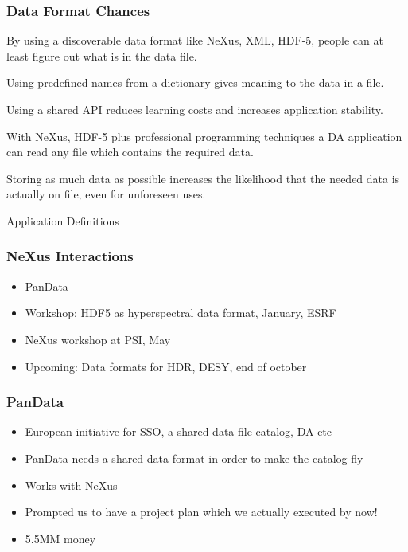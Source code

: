 \documentclass{beamer}
\begin{document}
\begin{frame} \frametitle{Data Format Chances}
\begin{description}
\item<1->[Chance 1] By using a discoverable data format like NeXus, XML, HDF-5, people can at 
 least figure out  what is in the data file. 
\item<2->[Chance 2] Using predefined names from a dictionary gives meaning to the data in a file.
\item<3->[Chance 3] Using a shared API reduces learning costs and increases application stability.
\item<4->[Chance 4] With NeXus, HDF-5 plus professional programming techniques a DA application can 
 read any file which contains the required data.
\item<5->[Chance 5] Storing as much data as possible increases the likelihood that the needed 
 data is actually on file, even for unforeseen uses. 
\item<6->[Chance 6] Application Definitions
\end{description}
\end{frame}


\begin{frame} \frametitle{NeXus Interactions}
\begin{itemize}
\item PanData
\item Workshop: HDF5 as hyperspectral data format, January, ESRF
\item NeXus workshop at PSI, May
\item Upcoming: Data formats for HDR, DESY, end of october
\end{itemize}
\end{frame}

\begin{frame} \frametitle{PanData}
\begin{itemize}
\item European initiative for SSO, a shared data file catalog, DA etc
\item PanData needs a shared data format in order to make the catalog fly 
\item Works with NeXus 
\item Prompted us to have a project plan which we actually executed by now!
\item 5.5MM money
\end{itemize}
\end{frame}
\end{document}
